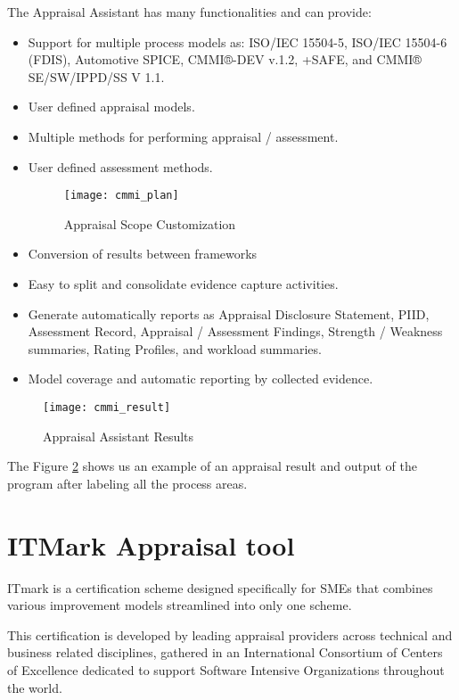 The Appraisal Assistant has many functionalities and can provide:
\begin{itemize}
	\item Support for multiple process models as: ISO/IEC 15504-5, ISO/IEC 15504-6 (FDIS), Automotive SPICE, CMMI®-DEV v.1.2, +SAFE, and CMMI® SE/SW/IPPD/SS V 1.1.
	\item User defined appraisal models.
	\item Multiple methods for performing appraisal / assessment.
	\item User defined assessment methods.
	\begin{figure}[h]
		\begin{center}
			\leavevmode
			\texttt{[image: cmmi\_plan]}
			\caption{Appraisal Scope Customization}
			\label{fig:cmmi_plan}
		\end{center}
	\end{figure}
	\item Conversion of results between frameworks
	\item Easy to split and consolidate evidence capture activities.
	\item Generate automatically reports as Appraisal Disclosure Statement, PIID, Assessment Record, Appraisal / Assessment Findings, Strength / Weakness summaries, Rating Profiles, and workload summaries.
	\item Model coverage and automatic reporting by collected evidence.
\end{itemize}


\begin{figure}[h]
	\begin{center}
		\leavevmode
		\texttt{[image: cmmi\_result]}
		\caption{Appraisal Assistant Results}
		\label{fig:cmmi_result}
	\end{center}
\end{figure}

The Figure \ref{fig:cmmi_result} shows us an example of an appraisal result and output of the program after labeling all the process areas.
\newpage


\section{ITMark Appraisal tool}

ITmark is a certification scheme designed specifically for SMEs that combines various improvement models streamlined into only one scheme.

This certification is developed by leading appraisal providers across technical and business related disciplines, gathered in an International Consortium of Centers of Excellence dedicated to support Software Intensive Organizations throughout the world.

